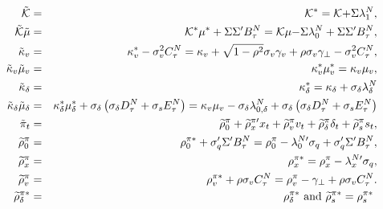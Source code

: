 \documentclass{article}
\begin{document}
\begin{eqnarray*}
\mathcal{\tilde{K}} &=&\mathcal{K}^{\ast }=\mathcal{K+}\Sigma \lambda
_{1}^{N}, \\
\mathcal{\tilde{K}}\tilde{\mu} &=&\mathcal{K}^{\ast }\mu ^{\ast }+\Sigma
\Sigma ^{\prime }B_{\tau }^{N}=\mathcal{K}\mu \mathcal{-}\Sigma \lambda
_{0}^{N}+\Sigma \Sigma ^{\prime }B_{\tau }^{N}, \\
\tilde{\kappa}_{v} &=&\kappa _{v}^{\ast }-\sigma _{v}^{2}C_{\tau
}^{N}=\kappa _{v}+\sqrt{1-\rho ^{2}}\sigma _{v}\gamma _{v}+\rho \sigma
_{v}\gamma _{\bot }-\sigma _{v}^{2}C_{\tau }^{N}, \\
\tilde{\kappa}_{v}\tilde{\mu}_{v} &=&\kappa _{v}^{\ast }\mu _{v}^{\ast
}=\kappa _{v}\mu _{v}, \\
\tilde{\kappa}_{\delta } &=&\kappa _{\delta }^{\ast }=\kappa _{\delta
}+\sigma _{\delta }\lambda _{\delta }^{N} \\
\tilde{\kappa}_{\delta }\tilde{\mu}_{\delta } &=&\kappa _{\delta }^{\ast
}\mu _{\delta }^{\ast }+\sigma _{\delta }\left( \sigma _{\delta }D_{\tau
}^{N}+\sigma _{s}E_{\tau }^{N}\right) =\kappa _{v}\mu _{v}-\sigma _{\delta
}\lambda _{0,\delta }^{N}+\sigma _{\delta }\left( \sigma _{\delta }D_{\tau
}^{N}+\sigma _{s}E_{\tau }^{N}\right) \\
\tilde{\pi}_{t} &=&\widetilde{\rho }_{0}^{\pi }+\widetilde{\rho }_{x}^{\pi
\prime }x_{t}+\widetilde{\rho }_{v}^{\pi }v_{t}+\widetilde{\rho }_{\delta
}^{\pi }\delta _{t}+\widetilde{\rho }_{s}^{\pi }s_{t}, \\
\widetilde{\rho }_{0}^{\pi } &=&\rho _{0}^{\pi \ast }+\sigma _{q}^{\prime
}\Sigma ^{\prime }B_{\tau }^{N}=\rho _{0}^{\pi }-\lambda _{0}^{N\prime
}\sigma _{q}+\sigma _{q}^{\prime }\Sigma ^{\prime }B_{\tau }^{N}, \\
\widetilde{\rho }_{x}^{\pi } &=&\rho _{x}^{\pi \ast }=\rho _{x}^{\pi
}-\lambda _{x}^{N\prime }\sigma _{q}, \\
\widetilde{\rho }_{v}^{\pi } &=&\rho _{v}^{\pi \ast }+\rho \sigma
_{v}C_{\tau }^{N}=\rho _{v}^{\pi }-\gamma _{\bot }+\rho \sigma _{v}C_{\tau
}^{N}.\medskip \\
\widetilde{\rho }_{\delta }^{\pi \ast } &=&\rho _{\delta }^{\pi \ast }\text{
and }\widetilde{\rho }_{s}^{\pi \ast }=\rho _{s}^{\pi \ast }\text{ }
\end{eqnarray*}
\end{document}
